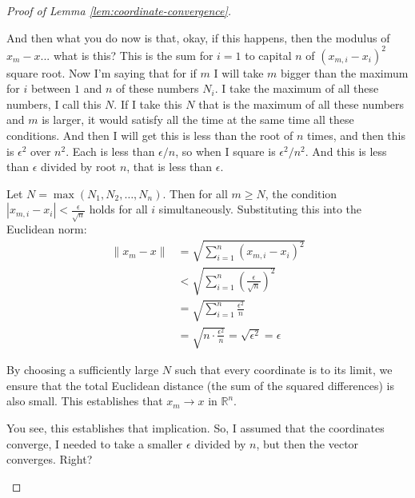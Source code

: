 \begin{proof}[Proof of Lemma \ref{lem:coordinate-convergence}]
\begin{spoken-clean}[00:22:55 - 00:24:45]
And then what you do now is that, okay, if this happens, then the modulus of $x_m - x$... what is this? This is the sum for $i=1$ to capital $n$ of $(x_{m,i} - x_i)^2$ square root. Now I'm saying that for if $m$ I will take $m$ bigger than the maximum for $i$ between $1$ and $n$ of these numbers $N_i$. I take the maximum of all these numbers, I call this $N$. If I take this $N$ that is the maximum of all these numbers and $m$ is larger, it would satisfy all the time at the same time all these conditions. And then I will get this is less than the root of $n$ times, and then this is $\epsilon^2$ over $n^2$. Each is less than $\epsilon/n$, so when I square is $\epsilon^2/n^2$. And this is less than $\epsilon$ divided by root $n$, that is less than $\epsilon$.
\end{spoken-clean}

\begin{math-stroke}
Let $N = \max(N_1, N_2, \dots, N_n)$. Then for all $m \ge N$, the condition $|x_{m,i} - x_i| < \frac{\epsilon}{\sqrt{n}}$ holds for all $i$ simultaneously.
Substituting this into the Euclidean norm:
\begin{align*}
\|x_m - x\| &= \sqrt{\sum_{i=1}^n (x_{m,i} - x_i)^2} \\
&< \sqrt{\sum_{i=1}^n \left( \frac{\epsilon}{\sqrt{n}} \right)^2} \\
&= \sqrt{\sum_{i=1}^n \frac{\epsilon^2}{n}} \\
&= \sqrt{n \cdot \frac{\epsilon^2}{n}} = \sqrt{\epsilon^2} = \epsilon
\end{align*}
\begin{explanation-of-steps}
By choosing a sufficiently large $N$ such that every coordinate is  to its limit, we ensure that the total Euclidean distance (the sum of the squared differences) is also small. This establishes that $x_m \to x$ in $\mathbb{R}^n$.
\end{explanation-of-steps}
\end{math-stroke}

\begin{spoken-clean}[00:24:45 - 00:25:20]
You see, this establishes that implication. So, I assumed that the coordinates converge, I needed to take a smaller $\epsilon$ divided by $n$, but then the vector converges. Right?
\end{spoken-clean}
\end{proof}

